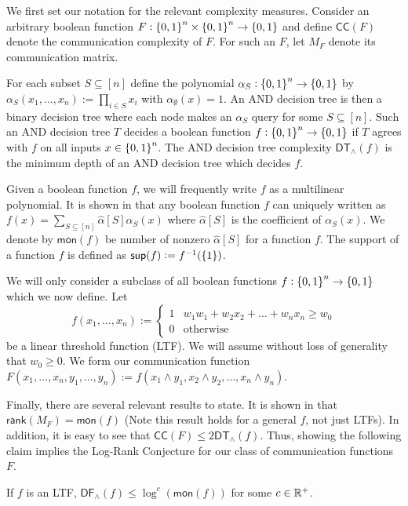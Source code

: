 We first set our notation for the relevant complexity measures. Consider an arbitrary boolean function $F : \set{0,1}^n\times\set{0,1}^n\to\set{0,1}$ and define $\mathsf{CC}(F)$ denote the communication complexity of $F$. For such an $F$, let $M_F$ denote its communication matrix. 
    
    For each subset $S\subseteq [n]$ define the polynomial $\alpha_S : \set{0,1}^n\to \set{0,1}$ by $\alpha_S(x_1,\dots,x_n) := \prod_{i\in S} x_i$ with $\alpha_\emptyset(x) = 1$. An AND decision tree is then a binary decision tree where each node makes an $\alpha_S$ query for some $S\subseteq [n]$. Such an AND decision tree $T$ decides a boolean function $f : \set{0,1}^n\to\set{0,1}$ if $T$ agrees with $f$ on all inputs $x\in \set{0,1}^n$. The AND decision tree complexity $\mathsf{DT}_{\wedge}(f)$ is the minimum depth of an AND decision tree which decides $f$. 
    
    Given a boolean function $f$, we will frequently write $f$ as a multilinear polynomial. It is shown in \cite{ODonnell2007} that any boolean function $f$ can uniquely written as $f(x) = \sum_{S\subseteq [n]} \hat{\alpha}[S]\alpha_S(x)$ where $\hat{\alpha}[S]$ is the coefficient of $\alpha_S(x)$. We denote by $\mathsf{mon}(f)$ be number of nonzero $\hat{\alpha}[S]$ for a function $f$. The support of a function $f$ is defined as $\mathsf{sup}(f) := f^{-1}(\set{1})$.
    
	We will only consider a subclass of all boolean functions $f: \set{0,1}^n\to \set{0,1}$ which we now define. Let 
    \[
    f(x_1,\dots,x_n) := \begin{cases}
		1 & w_1w_1 + w_2x_2 + \dots + w_nx_n \geq w_0\\
        0 & \text{otherwise}
	\end{cases}
    \] be a linear threshold function (LTF). We will assume without loss of generality that $w_0 \geq 0$. We form our communication function $F(x_1,\dots,x_n,y_1,\dots,y_n) := f(x_1\wedge y_1,x_2\wedge y_2,\dots,x_n\wedge y_n)$. 
    
    Finally, there are several relevant results to state. It is shown in \cite{Buhrman1999} that $\mathsf{rank}(M_F) = \mathsf{mon}(f)$ (Note this result holds for a general $f$, not just LTFs). In addition, it is easy to see that $\mathsf{CC}(F) \leq 2\mathsf{DT}_{\wedge}(f)$. Thus, showing the following claim implies the Log-Rank Conjecture for our class of communication functions $F$.
    \begin{proposition}
    	If $f$ is an LTF, $\mathsf{DF}_{\wedge}(f) \leq \log^c(\mathsf{mon}(f))$ for some $c \in \mathbb{R}^+$.
    \end{proposition}